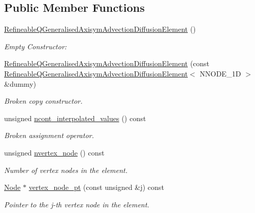 \subsection*{Public Member Functions}
\begin{DoxyCompactItemize}
\item 
\hyperlink{classoomph_1_1RefineableQGeneralisedAxisymAdvectionDiffusionElement_a8ebab382eeca66418b1ed01625a02805}{Refineable\+Q\+Generalised\+Axisym\+Advection\+Diffusion\+Element} ()
\begin{DoxyCompactList}\small\item\em Empty Constructor\+: \end{DoxyCompactList}\item 
\hyperlink{classoomph_1_1RefineableQGeneralisedAxisymAdvectionDiffusionElement_a71fb2c7254b11bb8a0ebffa6f4e74f33}{Refineable\+Q\+Generalised\+Axisym\+Advection\+Diffusion\+Element} (const \hyperlink{classoomph_1_1RefineableQGeneralisedAxisymAdvectionDiffusionElement}{Refineable\+Q\+Generalised\+Axisym\+Advection\+Diffusion\+Element}$<$ N\+N\+O\+D\+E\+\_\+1D $>$ \&dummy)
\begin{DoxyCompactList}\small\item\em Broken copy constructor. \end{DoxyCompactList}\item 
unsigned \hyperlink{classoomph_1_1RefineableQGeneralisedAxisymAdvectionDiffusionElement_aab092684a87e4e4231473a01b171946d}{ncont\+\_\+interpolated\+\_\+values} () const
\begin{DoxyCompactList}\small\item\em Broken assignment operator. \end{DoxyCompactList}\item 
unsigned \hyperlink{classoomph_1_1RefineableQGeneralisedAxisymAdvectionDiffusionElement_aa14f82deb49cf2910b0b15522f48f5a0}{nvertex\+\_\+node} () const
\begin{DoxyCompactList}\small\item\em Number of vertex nodes in the element. \end{DoxyCompactList}\item 
\hyperlink{classoomph_1_1Node}{Node} $\ast$ \hyperlink{classoomph_1_1RefineableQGeneralisedAxisymAdvectionDiffusionElement_a481456d85d19abedca780110a51032e0}{vertex\+\_\+node\+\_\+pt} (const unsigned \&j) const
\begin{DoxyCompactList}\small\item\em Pointer to the j-\/th vertex node in the element. \end{DoxyCompactList}\item 

\end{DoxyCompactItemize}
